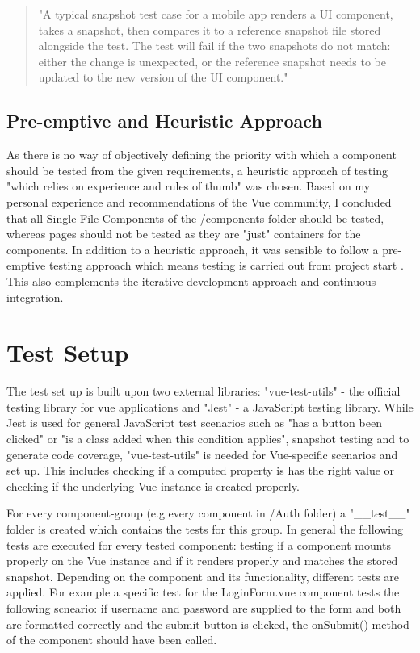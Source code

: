 \begin{quotation}
"A typical snapshot test case for a mobile app renders a UI component, takes a snapshot, then compares it to a reference snapshot file stored alongside the test. The test will fail if the two snapshots do not match: either the change is unexpected, or the reference snapshot needs to be updated to the new version of the UI component."
\end{quotation}

\subsection{Pre-emptive and Heuristic Approach} \label{preheur}
As there is no way of objectively defining the priority with which a component should be tested from the given requirements, a heuristic approach of testing "which relies on experience and rules of thumb" \cite{spillner2014software} was chosen. Based on my personal experience and recommendations of the Vue community, I concluded that all Single File Components of the /components folder should be tested, whereas pages should not be tested as they are "just" containers for the components. In addition to a heuristic approach, it was sensible to follow a pre-emptive testing approach which means testing is carried out from project start \cite{spillner2014software}. This also complements the iterative development approach and continuous integration. 

\section{Test Setup}
The test set up is built upon two external libraries: "vue-test-utils" - the official testing library for vue applications and "Jest" - a JavaScript testing library. While Jest is used for general JavaScript test scenarios such as "has a button been clicked" or "is a class added when this condition applies", snapshot testing and to generate code coverage, "vue-test-utils" is needed for Vue-specific scenarios and set up. This includes checking if a computed property is has the right value or checking if the underlying Vue instance is created properly.

For every component-group (e.g every component in /Auth folder) a "\_\_test\_\_" folder is created which contains the tests for this group. In general the following tests are executed for every tested component: testing if a component mounts properly on the Vue instance and if it renders properly and matches the stored snapshot. Depending on the component and its functionality, different tests are applied. For example a specific test for the LoginForm.vue component tests the following scneario: if username and password are supplied to the form and both are formatted correctly and the submit button is clicked, the onSubmit() method of the component should have been called.

